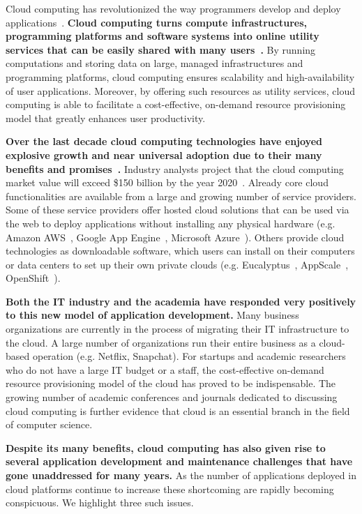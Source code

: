 Cloud computing has revolutionized the way programmers develop and deploy 
applications~\cite{Antonopoulos:2010:CCP:1855007,Pinheiro:2014:ACC:2618168.2618188}.
\textbf{Cloud computing turns compute infrastructures, programming platforms and software systems
into online utility services that can be easily shared with many users~\cite{hassan2011demystifying,Mell:2011:SND:2206223}.}
By running computations and storing data on large, managed infrastructures and 
programming platforms, cloud computing ensures scalability and high-availability of 
user applications. Moreover, by offering such resources
as utility services, cloud computing is able to facilitate a cost-effective, on-demand
resource provisioning model that greatly enhances user productivity.

\textbf{Over the last decade cloud computing technologies have enjoyed explosive growth 
and near universal adoption due to their many benefits and 
promises~\cite{Antonopoulos:2010:CCP:1855007,Pinheiro:2014:ACC:2618168.2618188}.} 
Industry analysts project that the cloud computing market value will exceed \$150 billion
by the year 2020~\cite{cloud-growth}.
Already core cloud 
functionalities are available from a large and growing number of service providers. 
Some of these service providers offer hosted cloud solutions that can be used
via the web to deploy applications without installing any physical hardware 
(e.g. Amazon AWS~\cite{amazon-aws-web}, Google App Engine~\cite{gae}, Microsoft Azure~\cite{azure-web}). Others
provide cloud technologies as downloadable software, which users can install
on their computers or data centers to set up their own private clouds 
(e.g. Eucalyptus~\cite{eucalyptus09}, AppScale~\cite{6488671}, OpenShift~\cite{openshift}). 

\textbf{Both the IT industry and the academia have responded very positively to this new 
model of application 
development.} Many business organizations are currently in the process of migrating
their IT infrastructure to the cloud. A large number of organizations
run their entire business as a cloud-based operation (e.g. Netflix, Snapchat). For startups
and academic researchers who do not have a large IT budget or a staff, the cost-effective 
on-demand resource provisioning model of the cloud has proved to be indispensable.
The growing number of academic conferences and journals dedicated to discussing
cloud computing is further evidence that cloud is an essential branch in the field
of computer science.

\textbf{Despite its many benefits, cloud computing has also given rise to several application
development and maintenance challenges that have gone unaddressed for many years.}
As the number of applications deployed in cloud platforms continue to increase these
shortcoming are rapidly becoming conspicuous. We highlight three such issues.
 
